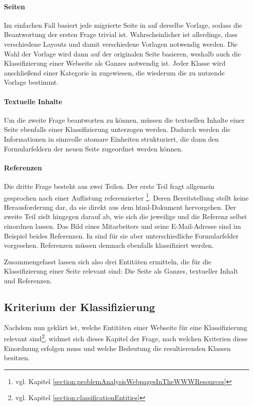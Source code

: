         \paragraph{Seiten}
        Im einfachen Fall basiert jede migrierte Seite in {\imperia} auf derselbe Vorlage,
        sodass die Beantwortung der ersten Frage trivial ist.
        Wahrscheinlicher ist allerdings,
        dass verschiedene Layouts und damit verschiedene Vorlagen
        notwendig werden.
        Die Wahl der Vorlage wird dann auf der originalen Seite basieren,
        weshalb auch die Klassifizierung einer Webseite als Ganzes notwendig ist.
        Jeder Klasse wird anschließend einer Kategorie in {\imperia}
        zugewiesen, die wiederum die zu nutzende Vorlage bestimmt.

        \paragraph{Textuelle Inhalte}
        Um die zweite Frage beantworten zu können,
        müssen die textuellen Inhalte einer Seite ebenfalls einer Klassifizierung
        unterzogen werden.
        Dadurch werden die Informationen in sinnvolle atomare Einheiten strukturiert,
        die dann den Formularfeldern der neuen Seite zugeordnet werden können.

        \paragraph{Referenzen}
        Die dritte Frage besteht aus zwei Teilen.
        Der erste Teil fragt allgemein gesprochen nach einer Auflistung
        referenzierter {\resources}\footnote{vgl. Kapitel \ref{section:problemAnalysisWebpagesInTheWWWResources}}.
        Deren Bereitstellung stellt keine Herausforderung dar,
        da sie direkt aus dem \gls{html}-Dokument hervorgehen.
        Der zweite Teil zielt hingegen darauf ab,
        wie sich die jeweilige {\resource} und die Referenz selbst einordnen lassen.
        Das Bild eines Mitarbeiters und seine E-Mail-Adresse sind im Beispiel beides Referenzen.
        In {\imperia} sind für sie aber unterschiedliche Formularfelder vorgesehen.
        Referenzen müssen demnach ebenfalls klassifiziert werden.

        Zusammengefasst lassen sich also drei Entitäten ermitteln,
        die für die Klassifizierung einer Seite relevant sind:
        Die Seite als Ganzes, textueller Inhalt und Referenzen.

    \subsection{Kriterium der Klassifizierung}
        \label{section:ClassificationCriteria}
        Nachdem nun geklärt ist, welche Entitäten einer Webseite für
        eine Klassifizierung relevant sind\footnote{vgl. Kapitel \ref{section:classificationEntities}},
        widmet sich dieses Kapitel der Frage, nach welchen
        Kriterien diese Einordnung erfolgen muss
        und welche Bedeutung die resultierenden Klassen besitzen.

